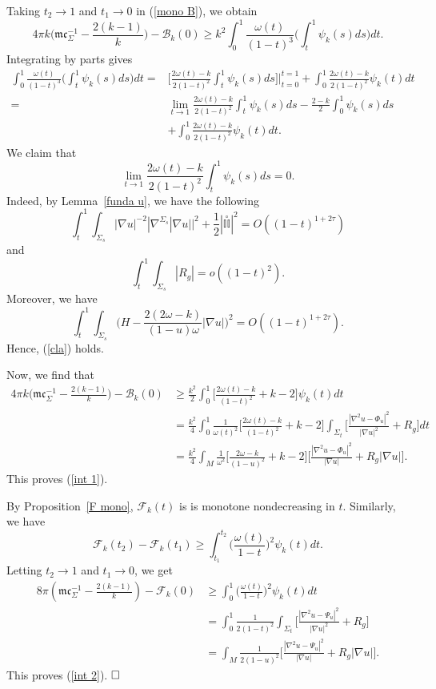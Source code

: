 \documentclass[12pt]{article}
\theoremstyle{definition}
\theoremstyle{plain}
\numberwithin{equation}{section}
\begin{document}
Taking $ t_{2}\to 1 $ and $ t_{1}\to 0 $ in (\ref{mono B}), we obtain
$$
4\pi k\Big(\mathfrak{m}\mathfrak{c}_{\Sigma}^{-1}-\frac{2(k-1)}{k}\Big)-\mathcal{B}_{k}(0)\geq k^{2}\int_{0}^{1}\frac{\omega(t)}{(1-t)^{3}}\Big(\int_{t}^{1}\psi_{k}(s)ds\Big)dt.
$$ 
Integrating by parts gives
$$
\begin{aligned}
\int_{0}^{1}\frac{\omega(t)}{(1-t)^{3}}\Big(\int_{t}^{1}\psi_{k}(s)ds\Big)dt=&\Big[\frac{2\omega(t)-k}{2(1-t)^{2}}\int_{t}^{1}\psi_{k}(s)ds\Big]\Big|_{t=0}^{t=1}+\int_{0}^{1}\frac{2\omega(t)-k}{2(1-t)^{2}}\psi_{k}(t)dt\\
=&\lim\limits_{t\to 1}\frac{2\omega(t)-k}{2(1-t)^{2}}\int_{t}^{1}\psi_{k}(s)ds-\frac{2-k}{2}\int_{0}^{1}\psi_{k}(s)ds\\
&+\int_{0}^{1}\frac{2\omega(t)-k}{2(1-t)^{2}}\psi_{k}(t)dt.
\end{aligned}
$$
We claim that 
\begin{equation}\label{cla}
\lim\limits_{t\to 1}\frac{2\omega(t)-k}{2(1-t)^{2}}\int_{t}^{1}\psi_{k}(s)ds=0.
\end{equation}
Indeed, by Lemma~\ref{funda u}, we have the following
$$
\int_{t}^{1}\int_{\Sigma_{s}}|\nabla u|^{-2}|\nabla^{\Sigma_{s}}|\nabla u||^{2}+\frac{1}{2}|\overset{\circ}{\mathbb{II}}|^{2}=O((1-t)^{1+2\tau})
$$
and 
$$
\int_{t}^{1}\int_{\Sigma_{s}}|R_{g}|=o((1-t)^{2}).
$$
Moreover, we have
$$
\int_{t}^{1}\int_{\Sigma_{s}}\Big(H-\frac{2(2\omega-k)}{(1-u)\omega}|\nabla u|\Big)^{2}=O((1-t)^{1+2\tau}).
$$
Hence, (\ref{cla}) holds.

Now, we find that 
$$
\begin{aligned}
4\pi k\Big(\mathfrak{m}\mathfrak{c}_{\Sigma}^{-1}-\frac{2(k-1)}{k}\Big)-\mathcal{B}_{k}(0)&\geq \frac{k^{2}}{2}\int_{0}^{1}\Big[\frac{2\omega(t)-k}{(1-t)^{2}}+k-2\Big]\psi_{k}(t)dt\\
&=\frac{k^{2}}{4}\int_{0}^{1}\frac{1}{\omega(t)^{2}}\Big[\frac{2\omega(t)-k}{(1-t)^{2}}+k-2\Big]\int_{\Sigma_{t}}\Big[\frac{|\nabla^{2}u-\Phi_{u}|^{2}}{|\nabla u|^{2}}+R_{g} \Big]dt\\
&=\frac{k^{2}}{4}\int_{M}\frac{1}{\omega^{2}}\Big[\frac{2\omega-k}{(1-u)^{2}}+k-2\Big]\Big[\frac{|\nabla^{2}u-\Phi_{u}|^{2}}{|\nabla u|}+R_{g}|\nabla u|\Big]. 
\end{aligned}
$$
This proves (\ref{int 1}).

By Proposition~\ref{F mono}, $ \mathcal{F}_{k}(t) $ is is monotone nondecreasing in $ t $.  Similarly, we have 
$$
\mathcal{F}_{k}(t_{2})-\mathcal{F}_{k}(t_{1})\geq \int_{t_{1}}^{t_{2}}\Big(\frac{\omega(t)}{1-t}\Big)^{2}\psi_{k}(t)dt.
$$
Letting $ t_{2}\to 1 $ and $ t_{1}\to 0 $, we get 
$$
\begin{aligned}
8\pi(\mathfrak{m}\mathfrak{c}_{\Sigma}^{-1}-\frac{2(k-1)}{k})-\mathcal{F}_{k}(0)&\geq \int_{0}^{1}\Big(\frac{\omega(t)}{1-t}\Big)^{2}\psi_{k}(t)dt\\
&=\int_{0}^{1}\frac{1}{2(1-t)^{2}}\int_{\Sigma_{t}}\Big[\frac{|\nabla^{2}u-\Psi_{u}|^{2}}{|\nabla u|^{2}}+R_{g} \Big]\\
&=\int_{M}\frac{1}{2(1-u)^{2}}\Big[\frac{|\nabla^{2}u-\Psi_{u}|^{2}}{|\nabla u|}+R_{g}|\nabla u|\Big].
\end{aligned}
$$
This proves (\ref{int 2}).
$\hfill\square$
\end{document}
